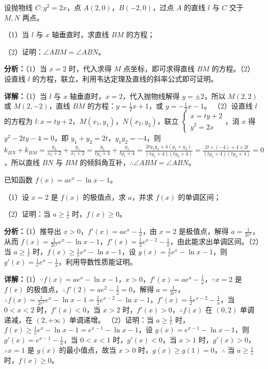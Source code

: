 \begin{question}[points=12]
设抛物线 $C:y^2=2x$，点 $A(2,0)$，$B(-2,0)$，过点 $A$ 的直线 $l$ 与 $C$ 交于 $M,N$ 两点。

（1）当 $l$ 与 $x$ 轴垂直时，求直线 $BM$ 的方程；

（2）证明：$\angle ABM=\angle ABN$。
\begin{solution}

\textbf{分析：}（1）当 $x=2$ 时，代入求得 $M$ 点坐标，即可求得直线 $BM$ 的方程。（2）设直线 $l$ 的方程，联立，利用韦达定理及直线的斜率公式即可证明。

\textbf{详解：}（1）当 $l$ 与 $x$ 轴垂直时，$x=2$，代入抛物线解得 $y=\pm2$，所以 $M(2,2)$ 或 $M(2,-2)$，直线 $BM$ 的方程：$y=\frac{1}{2}x+1$，或 $y=-\frac{1}{2}x-1$。
（2）设直线 $l$ 的方程为 $l:x=ty+2$，$M(x_1,y_1)$，$N(x_2,y_2)$，联立 $\begin{cases} x=ty+2 \\ y^2=2x \end{cases}$，消 $x$ 得 $y^2-2ty-4=0$，即 $y_1+y_2=2t$，$y_1y_2=-4$，则 $k_{BN}+k_{BM}=\frac{y_2}{x_2+2}+\frac{y_1}{x_1+2}=\frac{y_2}{ty_2+4}+\frac{y_1}{ty_1+4}=\frac{2ty_1y_2+4(y_1+y_2)}{(ty_1+4)(ty_2+4)}=\frac{2t\times(-4)+4\times2t}{(ty_1+4)(ty_2+4)}=0$，所以直线 $BN$ 与 $BM$ 的倾斜角互补，$\therefore \angle ABM=\angle ABN$。
\end{solution}
\end{question}

\begin{question}[points=12]
已知函数 $f(x)=ae^x-\ln x-1$。

（1）设 $x=2$ 是 $f(x)$ 的极值点，求 $a$，并求 $f(x)$ 的单调区间；

（2）证明：当 $a\ge\frac{1}{e}$ 时，$f(x)\ge0$。
\begin{solution}

\textbf{分析：}（1）推导出 $x>0$，$f'(x)=ae^x-\frac{1}{x}$，由 $x=2$ 是极值点，解得 $a=\frac{1}{2e^2}$，从而 $f(x)=\frac{1}{2e^2}e^x-\ln x-1$，$f'(x)=\frac{1}{2}e^{x-2}-\frac{1}{x}$，由此能求出单调区间。（2）当 $a\ge\frac{1}{e}$ 时，$f(x)\ge\frac{1}{e}e^x-\ln x-1$，设 $g(x)=\frac{1}{e}e^x-\ln x-1$，则 $g'(x)=\frac{1}{e}e^x-\frac{1}{x}$，利用导数性质能证明。

\textbf{详解：}（1）$\because f(x)=ae^x-\ln x-1$，$x>0$，$f'(x)=ae^x-\frac{1}{x}$，$\because x=2$ 是 $f(x)$ 的极值点，$\therefore f'(2)=ae^2-\frac{1}{2}=0$，解得 $a=\frac{1}{2e^2}$，$\therefore f(x)=\frac{1}{2e^2}e^x-\ln x-1=\frac{1}{2}e^{x-2}-\ln x-1$，$f'(x)=\frac{1}{2}e^{x-2}-\frac{1}{x}$，当 $0<x<2$ 时，$f'(x)<0$，当 $x>2$ 时，$f'(x)>0$，$\therefore f(x)$ 在 $(0,2)$ 单调递减，在 $(2,+\infty)$ 单调递增。
（2）证明：当 $a\ge\frac{1}{e}$ 时，$f(x)\ge\frac{1}{e}e^x-\ln x-1=e^{x-1}-\ln x-1$，设 $g(x)=e^{x-1}-\ln x-1$，则 $g'(x)=e^{x-1}-\frac{1}{x}$，当 $0<x<1$ 时，$g'(x)<0$，当 $x>1$ 时，$g'(x)>0$，$\therefore x=1$ 是 $g(x)$ 的最小值点，故当 $x>0$ 时，$g(x)\ge g(1)=0$，$\therefore$ 当 $a\ge\frac{1}{e}$ 时，$f(x)\ge0$。
\end{solution}
\end{question}

